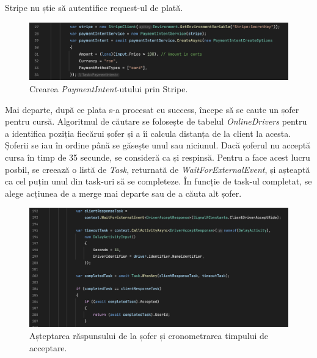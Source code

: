 Stripe nu știe să autentifice request-ul de plată.
\begin{figure}[H]
    \centering
    \includegraphics[width=14cm]{Assets/intent.png}
    \caption{Crearea \textit{PaymentIntent}-utului prin Stripe.}
    \label{fig:intent}
\end{figure}
Mai departe, după ce plata s-a procesat cu success, începe să se caute un șofer pentru cursă.
Algoritmul de căutare se folosește de tabelul \textit{OnlineDrivers} pentru a identifica poziția
fiecărui șofer și a îi calcula distanța de la client la acesta. Șoferii se iau în ordine până se găsește 
unul sau niciunul. Dacă șoferul nu acceptă cursa în timp de 35 secunde, se consideră ca și respinsă.
Pentru a face acest lucru posbil, se creează o listă de \textit{Task}, returnată de \textit{WaitForExternalEvent},
și așteaptă ca cel puțin unul din task-uri să se completeze. În funcție de task-ul completat, se alege
acțiunea de a merge mai departe sau de a căuta alt șofer.

\begin{figure}[H]
    \centering
    \includegraphics[width=14cm]{Assets/WaitForDriver.png}
    \caption{Așteptarea răspunsului de la șofer și cronometrarea timpului de acceptare.}
    \label{fig:WaitForDriver}
\end{figure}

